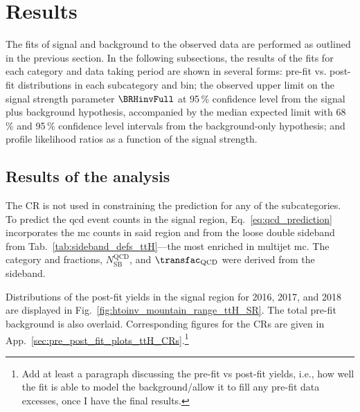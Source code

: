 \section{Results}
\label{sec:htoinv_results}

The fits of signal and background to the observed data are performed as outlined in the previous section. In the following subsections, the results of the fits for each category and data taking period are shown in several forms: pre-fit vs. post-fit distributions in each subcategory and \ptmiss bin; the observed upper limit on the signal strength parameter $\BRHinvFull$ at 95\,\% confidence level from the signal plus background hypothesis, accompanied by the median expected limit with 68\,\% and 95\,\% confidence level intervals from the background-only hypothesis; and profile likelihood ratios as a function of the signal strength.




\subsection{Results of the \texorpdfstring{\ttH}{ttH} analysis}
\label{subsec:htoinv_analysis_ttH}

The \singlePhotonCr \gls{CR} is not used in constraining the \ztonunu prediction for any of the subcategories. To predict the \acrshort{qcd} event counts in the signal region, Eq.~\ref{eq:qcd_prediction} incorporates the \acrshort{mc} counts in said region and from the loose double sideband from Tab.~\ref{tab:sideband_defs_ttH}---the most enriched in multijet \acrshort{mc}. The category and \ptmiss fractions, $N_{\mathrm{SB}}^{\mathrm{QCD}}$, and $\transfac_{\mathrm{QCD}}$ were derived from the sideband.

Distributions of the post-fit yields in the signal region for 2016, 2017, and 2018 are displayed in Fig.~\ref{fig:htoinv_mountain_range_ttH_SR}. The total pre-fit background is also overlaid. Corresponding figures for the \glspl{CR} are given in App.~\ref{sec:pre_post_fit_plots_ttH_CRs}.\footnote{Add at least a paragraph discussing the pre-fit vs post-fit yields, i.e., how well the fit is able to model the background/allow it to fill any pre-fit data excesses, once I have the final results.}

